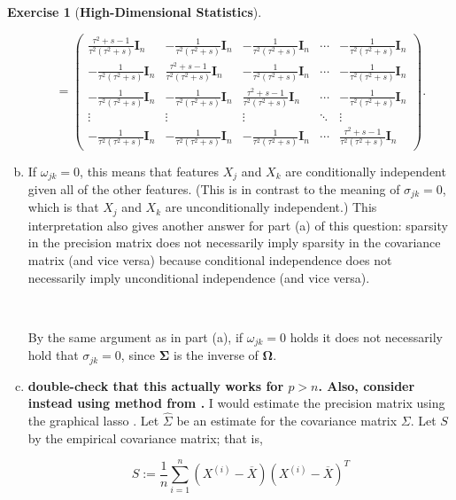 \documentclass{article}
\theoremstyle{definition}
\newtheorem{exercise}{Exercise}
\theoremstyle{definition}
\theoremstyle{definition}
\theoremstyle{definition}
\begin{document}
\begin{exercise}[\textbf{High-Dimensional Statistics}]
\begin{enumerate}[(a)]
\[
=  \begin{pmatrix}
\frac{\tau^2+s - 1}{\tau^2(\tau^2 +s)} \boldsymbol{I}_n & - \frac{1}{\tau^2(\tau^2 +s)} \boldsymbol{I}_n & - \frac{1}{\tau^2(\tau^2 +s)} \boldsymbol{I}_n & \cdots & - \frac{1}{\tau^2(\tau^2 +s)} \boldsymbol{I}_n \\
- \frac{1}{\tau^2(\tau^2 +s)} \boldsymbol{I}_n & \frac{\tau^2+s-1}{\tau^2(\tau^2 +s)} \boldsymbol{I}_n &  - \frac{1}{\tau^2(\tau^2 +s)} \boldsymbol{I}_n & \cdots & - \frac{1}{\tau^2(\tau^2 +s)} \boldsymbol{I}_n \\
- \frac{1}{\tau^2(\tau^2 +s)} \boldsymbol{I}_n &  - \frac{1}{\tau^2(\tau^2 +s)} \boldsymbol{I}_n & \frac{\tau^2+s-1}{\tau^2(\tau^2 +s)} \boldsymbol{I}_n  & \cdots & - \frac{1}{\tau^2(\tau^2 +s)} \boldsymbol{I}_n \\
\vdots & \vdots & \vdots & \ddots & \vdots \\
- \frac{1}{\tau^2(\tau^2 +s)} \boldsymbol{I}_n &  - \frac{1}{\tau^2(\tau^2 +s)} \boldsymbol{I}_n & - \frac{1}{\tau^2(\tau^2 +s)} \boldsymbol{I}_n  & \cdots  & \frac{\tau^2+s-1}{\tau^2(\tau^2 +s)} \boldsymbol{I}_n
\end{pmatrix}.
\]


\item If \(\omega_{jk}=0\), this means that features \(X_j\) and \(X_k\) are conditionally independent given all of the other features. (This is in contrast to the meaning of \(\sigma_{jk}= 0\), which is that \(X_j\) and \(X_k\) are unconditionally independent.) This interpretation also gives another answer for part (a) of this question: sparsity in the precision matrix does not necessarily imply sparsity in the covariance matrix (and vice versa) because conditional independence does not necessarily imply unconditional independence (and vice versa). 

\

By the same argument as in part (a), if \(\omega_{jk} = 0\) holds it does not necessarily hold that \(\sigma_{jk} =0\), since \(\boldsymbol{\Sigma}\) is the inverse of \(\boldsymbol{\Omega}\).

\item \textbf{double-check that this actually works for \(p > n\). Also, consider instead using method from \citet{Fan2008}.} I would estimate the precision matrix using the graphical lasso \citep{Friedman2008}. Let \(\hat{\Sigma}\) be an estimate for the covariance matrix \(\Sigma\). Let \(S\) by the empirical covariance matrix; that is,

\[
S := \frac{1}{n} \sum_{i=1}^n (X^{(i)} - \overline{X})(X^{(i)} - \overline{X})^T
\]


\end{enumerate}
\end{exercise}
\end{document}
